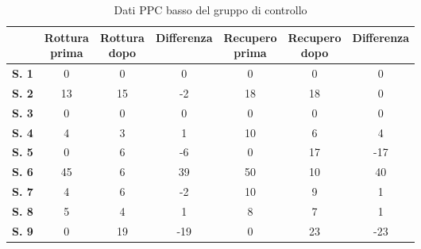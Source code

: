 \begin{table}[H]
\begin{center}
\begin{tabular}{|c|c|c|c|c|c|c|} \hline
{\textbf{}} & \pbox{20cm}{\textbf{Rottura} \\ \textbf{prima}} & \pbox{20cm}{\textbf{Rottura} \\ \textbf{dopo}} & \textbf{Differenza} & \pbox{20cm}{\textbf{Recupero} \\ \textbf{prima}} & \pbox{20cm}{\textbf{Recupero} \\ \textbf{dopo}} & \textbf{Differenza} \\ \hline
\textbf{S. 1} & 0 & 0 & 0 & 0 & 0 & 0 \\ \hline
\textbf{S. 2} & 13 & 15 & -2 & 18 & 18 & 0 \\ \hline
\textbf{S. 3} & 0 & 0 & 0 & 0 & 0 & 0 \\ \hline
\textbf{S. 4} & 4 & 3 & 1 & 10 & 6 & 4 \\ \hline
\textbf{S. 5} & 0 & 6 & -6 & 0 & 17 & -17 \\ \hline
\textbf{S. 6} & 45 & 6 & 39 & 50 & 10 & 40  \\ \hline
\textbf{S. 7} & 4 & 6 & -2 & 10 & 9 & 1 \\ \hline
\textbf{S. 8} & 5 & 4 & 1 & 8 & 7 & 1 \\ \hline
\textbf{S. 9} & 0 & 19 & -19 & 0 & 23 & -23 \\ \hline
\end{tabular}
\end{center}
\caption{Dati PPC basso del gruppo di controllo}
\end{table}

\\\ \\\  

